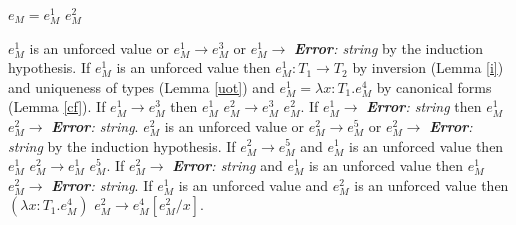 \begin{case}

$e_{M}=e_{M}^{1}$ $e_{M}^{2}$

$e_{M}^{1}$ is an unforced value or $e_{M}^{1}\rightarrow e_{M}^{3}$ or $e_{M}^{1}\rightarrow$ \emph{\textbf{Error}: string} by the induction hypothesis.  If $e_{M}^{1}$ is an unforced value then $e_{M}^{1}:T_{1}\rightarrow T_{2}$ by inversion (Lemma \ref{i}) and uniqueness of types (Lemma \ref{uot}) and $e_{M}^{1}=\lambda x:T_{1}.e_{M}^{4}$ by canonical forms (Lemma \ref{cf}).  If $e_{M}^{1}\rightarrow e_{M}^{3}$ then $e_{M}^{1}$ $e_{M}^{2}\rightarrow e_{M}^{3}$ $e_{M}^{2}$.  If $e_{M}^{1}\rightarrow$ \emph{\textbf{Error}: string} then $e_{M}^{1}$ $e_{M}^{2}\rightarrow$ \emph{\textbf{Error}: string}.  $e_{M}^{2}$ is an unforced value or $e_{M}^{2}\rightarrow e_{M}^{5}$ or $e_{M}^{2}\rightarrow$ \emph{\textbf{Error}: string} by the induction hypothesis.  If $e_{M}^{2}\rightarrow e_{M}^{5}$ and $e_{M}^{1}$ is an unforced value then $e_{M}^{1}$ $e_{M}^{2}\rightarrow e_{M}^{1}$ $e_{M}^{5}$.  If $e_{M}^{2}\rightarrow$ \emph{\textbf{Error}: string} and $e_{M}^{1}$ is an unforced value then $e_{M}^{1}$ $e_{M}^{2}\rightarrow$ \emph{\textbf{Error}: string}.  If $e_{M}^{1}$ is an unforced value and $e_{M}^{2}$ is an unforced value then $(\lambda x:T_{1}.e_{M}^{4})$ $e_{M}^{2}\rightarrow e_{M}^{4}[e_{M}^{2}/x]$.

\end{case}